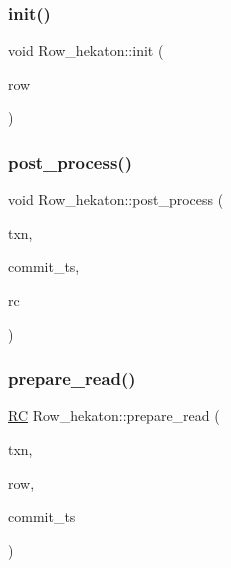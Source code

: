 \mbox{\label{classRow__hekaton_a2d8710389607a31f79cfa616ee88eea8}} 
\subsubsection{\texorpdfstring{init()}{init()}}
{\footnotesize\ttfamily void Row\+\_\+hekaton\+::init (\begin{DoxyParamCaption}\item[{\hyperlink{classrow__t}{row\+\_\+t} $\ast$}]{row }\end{DoxyParamCaption})}

\mbox{\label{classRow__hekaton_a16995f9c439700a4c777c78ea8531536}} 
\subsubsection{\texorpdfstring{post\+\_\+process()}{post\_process()}}
{\footnotesize\ttfamily void Row\+\_\+hekaton\+::post\+\_\+process (\begin{DoxyParamCaption}\item[{\hyperlink{classtxn__man}{txn\+\_\+man} $\ast$}]{txn,  }\item[{\hyperlink{global_8h_aaf095dfc9b10f757c968fe146ad7e724}{ts\+\_\+t}}]{commit\+\_\+ts,  }\item[{\hyperlink{global_8h_a78c49a674c810fdd03d20432f7be864a}{RC}}]{rc }\end{DoxyParamCaption})}

\mbox{\label{classRow__hekaton_a891063b67355e2677fa38bdac4a0f52d}} 
\subsubsection{\texorpdfstring{prepare\+\_\+read()}{prepare\_read()}}
{\footnotesize\ttfamily \hyperlink{global_8h_a78c49a674c810fdd03d20432f7be864a}{RC} Row\+\_\+hekaton\+::prepare\+\_\+read (\begin{DoxyParamCaption}\item[{\hyperlink{classtxn__man}{txn\+\_\+man} $\ast$}]{txn,  }\item[{\hyperlink{classrow__t}{row\+\_\+t} $\ast$}]{row,  }\item[{\hyperlink{global_8h_aaf095dfc9b10f757c968fe146ad7e724}{ts\+\_\+t}}]{commit\+\_\+ts }\end{DoxyParamCaption})}



